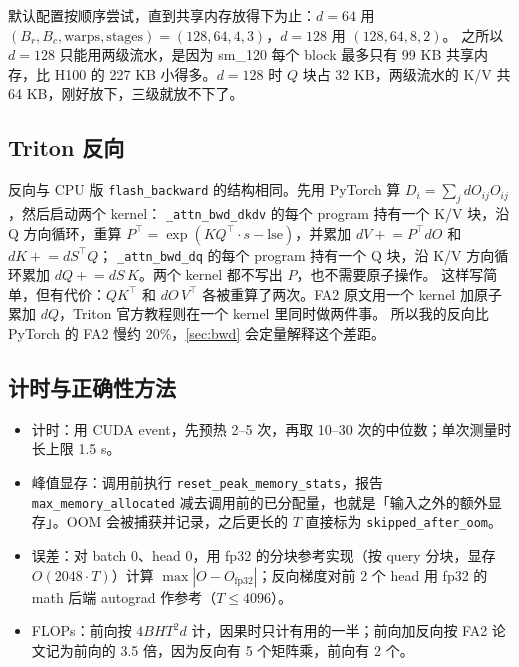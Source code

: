 \documentclass[11pt,a4paper]{ctexart}
\begin{document}
默认配置按顺序尝试，直到共享内存放得下为止：$d=64$ 用 $(B_r,B_c,\text{warps},\text{stages})=(128,64,4,3)$，$d=128$ 用 $(128,64,8,2)$。
之所以 $d=128$ 只能用两级流水，是因为 sm\_120 每个 block 最多只有 99 KB 共享内存，比 H100 的 227 KB 小得多。$d=128$ 时 $Q$ 块占 32 KB，两级流水的 K/V 共 64 KB，刚好放下，三级就放不下了。

\subsection{Triton 反向}\label{sec:impl-bwd}

反向与 CPU 版 \texttt{flash\_backward} 的结构相同。先用 PyTorch 算 $D_i=\sum_j dO_{ij}O_{ij}$，然后启动两个 kernel：
\texttt{\_attn\_bwd\_dkdv} 的每个 program 持有一个 K/V 块，沿 Q 方向循环，重算 $P^\top=\exp(KQ^\top\cdot s-\mathrm{lse})$，并累加 $dV\mathrel{+}=P^\top dO$ 和 $dK\mathrel{+}=dS^\top Q$；
\texttt{\_attn\_bwd\_dq} 的每个 program 持有一个 Q 块，沿 K/V 方向循环累加 $dQ\mathrel{+}=dS\,K$。两个 kernel 都不写出 $P$，也不需要原子操作。
这样写简单，但有代价：$QK^\top$ 和 $dO\,V^\top$ 各被重算了两次。FA2 原文用一个 kernel 加原子累加 $dQ$，Triton 官方教程则在一个 kernel 里同时做两件事。
所以我的反向比 PyTorch 的 FA2 慢约 20\%，\cref{sec:bwd} 会定量解释这个差距。

\subsection{计时与正确性方法}
\begin{itemize}
\item 计时：用 CUDA event，先预热 2–5 次，再取 10–30 次的中位数；单次测量时长上限 1.5 s。
\item 峰值显存：调用前执行 \texttt{reset\_peak\_memory\_stats}，报告 \texttt{max\_memory\_allocated} 减去调用前的已分配量，也就是「输入之外的额外显存」。OOM 会被捕获并记录，之后更长的 $T$ 直接标为 \texttt{skipped\_after\_oom}。
\item 误差：对 batch 0、head 0，用 fp32 的分块参考实现（按 query 分块，显存 $O(2048\cdot T)$）计算 $\max|O-O_{\text{fp32}}|$；反向梯度对前 2 个 head 用 fp32 的 math 后端 autograd 作参考（$T\le4096$）。
\item FLOPs：前向按 $4BHT^2d$ 计，因果时只计有用的一半；前向加反向按 FA2 论文记为前向的 3.5 倍，因为反向有 5 个矩阵乘，前向有 2 个。
\end{itemize}
\end{document}
